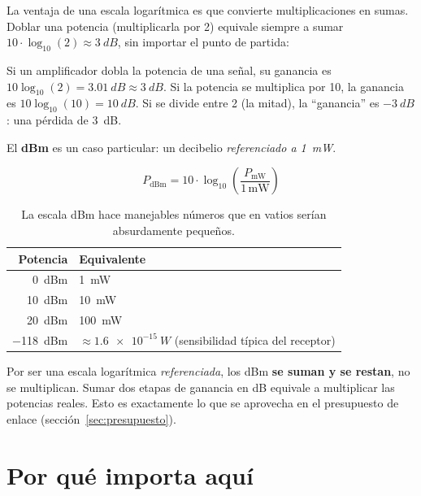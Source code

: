 La ventaja de una escala logarítmica es que convierte multiplicaciones en sumas. Doblar una
potencia (multiplicarla por 2) equivale siempre a sumar $10 \cdot \log_{10}(2) \approx
\SI{3}{dB}$, sin importar el punto de partida:

\begin{ejemplo}
Si un amplificador dobla la potencia de una señal, su ganancia es
$10\log_{10}(2) = \SI{3.01}{dB} \approx \SI{3}{dB}$.
Si la potencia se multiplica por 10, la ganancia es $10\log_{10}(10) = \SI{10}{dB}$.
Si se divide entre 2 (la mitad), la ``ganancia'' es $\SI{-3}{dB}$: una pérdida de \SI{3}{dB}.
\end{ejemplo}

El \textbf{dBm} es un caso particular: un decibelio \emph{referenciado a \SI{1}{mW}}.

\begin{equation}
  P_{\text{dBm}} = 10 \cdot \log_{10}\!\left(\frac{P_{\text{mW}}}{1\,\text{mW}}\right)
  \label{eq:dbm}
\end{equation}

\begin{table}[h]
  \centering
  \begin{tabular}{@{}rl@{}}
    \toprule
    Potencia & Equivalente \\
    \midrule
    \SI{0}{dBm}  & \SI{1}{mW} \\
    \SI{10}{dBm} & \SI{10}{mW} \\
    \SI{20}{dBm} & \SI{100}{mW} \\
    \SI{-118}{dBm} & $\approx \SI{1.6e-15}{W}$ (sensibilidad típica del receptor) \\
    \bottomrule
  \end{tabular}
  \caption{La escala dBm hace manejables números que en vatios serían absurdamente pequeños.}
\end{table}

\begin{nota}
Por ser una escala logarítmica \emph{referenciada}, los dBm \textbf{se suman y se restan}, no
se multiplican. Sumar dos etapas de ganancia en dB equivale a multiplicar las potencias reales.
Esto es exactamente lo que se aprovecha en el presupuesto de enlace (sección~\ref{sec:presupuesto}).
\end{nota}

\section{Por qué importa aquí}

